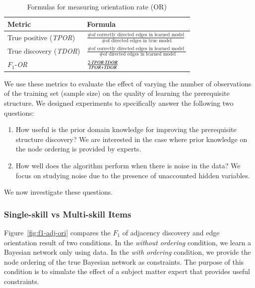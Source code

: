 \documentclass{edm_template}
\begin{document}
{	
	\begin{table}[th]
		\centering
		\caption{Formulas for measuring orientation rate (OR) \label{tbl:or}}
		\label{my-label}
		\begin{tabular}{@{}ll@{}}
			\toprule
			Metric & Formula \\ \midrule
			True positive  (\emph{TPOR}) & $\frac{ \text{\# of correctly directed edges in learned model} } {\text{ \# of directed edges in true model}}$  \\
			True discovery   (\emph{TDOR})& $\frac{ \text{\# of correctly directed edges in learned model } }{\text{ \# of directed edges in learned model}} $\\
			$F_1$-\textit{OR} &  $\frac{  2\cdot \text{\emph{TPOR}} \cdot \text{\emph{TDOR}} }{\text{\emph{TPOR}}+\text{\emph{TDOR}}}$ \\
			\bottomrule
		\end{tabular}
	\end{table}
	
	We use these metrics to evaluate the effect of varying the  number of observations  of the training set (sample size) on the quality of learning the prerequisite structure.
	We designed experiments to specifically answer the following two questions:
	\begin{enumerate}[noitemsep,topsep=2pt,parsep=0pt,partopsep=0pt]
		\item How useful is the prior domain knowledge for improving the prerequisite structure discovery?
		We are  interested in the case where prior knowledge on the node ordering is provided by experts.
		\item How well does the algorithm perform when there is noise in the data?
		We focus on studying noise due to the presence of unaccounted hidden variables.%
	\end{enumerate}
	We now investigate these questions.


	\subsubsection{Single-skill vs Multi-skill Items}
	
	Figure~\ref{fig:f1-adj-ori} compares the $F_1$ of adjacency discovery and edge orientation result of two conditions. 
	In the \textit{without ordering} condition, we learn a  Bayesian network  only using  data.
	In the \textit{with ordering} condition, we provide the node ordering of the true Bayesian network as constraints.
	The  purpose of  this condition is to simulate the effect of a subject matter expert that provides  useful constraints.
	
}
\end{document}
